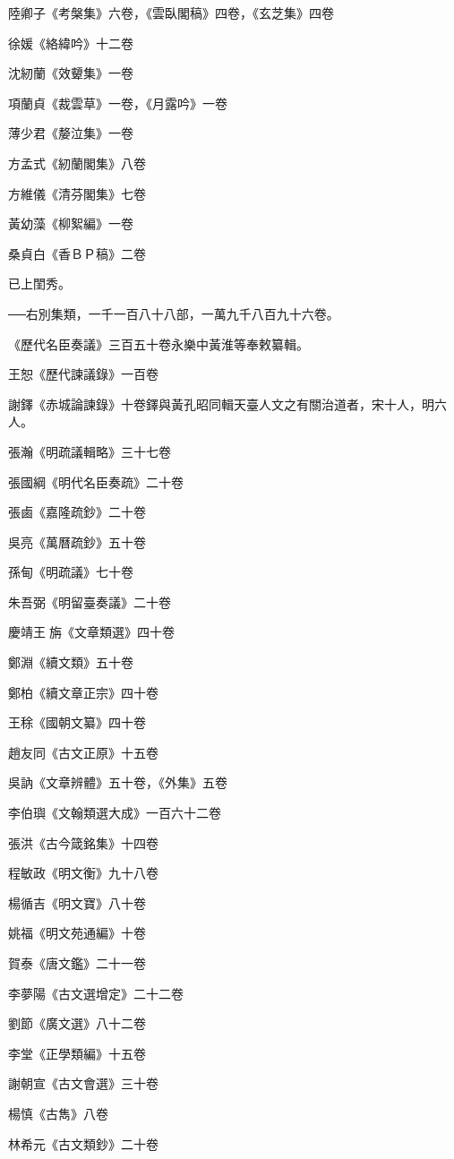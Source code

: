 陸卿子《考槃集》六卷，《雲臥閣稿》四卷，《玄芝集》四卷

徐媛《絡緯吟》十二卷

沈紉蘭《效顰集》一卷

項蘭貞《裁雲草》一卷，《月露吟》一卷

薄少君《嫠泣集》一卷

方孟式《紉蘭閣集》八卷

方維儀《清芬閣集》七卷

黃幼藻《柳絮編》一卷

桑貞白《香ＢＰ稿》二卷

已上閨秀。

──右別集類，一千一百八十八部，一萬九千八百九十六卷。

《歷代名臣奏議》三百五十卷永樂中黃淮等奉敕纂輯。

王恕《歷代諫議錄》一百卷

謝鐸《赤城論諫錄》十卷鐸與黃孔昭同輯天臺人文之有關治道者，宋十人，明六人。

張瀚《明疏議輯略》三十七卷

張國綱《明代名臣奏疏》二十卷

張鹵《嘉隆疏鈔》二十卷

吳亮《萬曆疏鈔》五十卷

孫甸《明疏議》七十卷

朱吾弼《明留臺奏議》二十卷

慶靖王旃《文章類選》四十卷

鄭淵《續文類》五十卷

鄭柏《續文章正宗》四十卷

王稌《國朝文纂》四十卷

趙友同《古文正原》十五卷

吳訥《文章辨體》五十卷，《外集》五卷

李伯璵《文翰類選大成》一百六十二卷

張洪《古今箴銘集》十四卷

程敏政《明文衡》九十八卷

楊循吉《明文寶》八十卷

姚福《明文苑通編》十卷

賀泰《唐文鑑》二十一卷

李夢陽《古文選增定》二十二卷

劉節《廣文選》八十二卷

李堂《正學類編》十五卷

謝朝宣《古文會選》三十卷

楊慎《古雋》八卷

林希元《古文類鈔》二十卷


